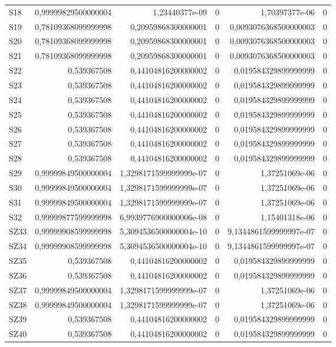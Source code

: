 \begin{longtable}{lrrrrr}
S18 & 0,99999829500000004 & 1,23440377e-09 & 0 & 1,70397377e-06 & 0 \\
S19 & 0,78109368099999998 & 0,20959868300000001 & 0 & 0,0093076368500000003 & 0 \\
S20 & 0,78109368099999998 & 0,20959868300000001 & 0 & 0,0093076368500000003 & 0 \\
S21 & 0,78109368099999998 & 0,20959868300000001 & 0 & 0,0093076368500000003 & 0 \\
S22 & 0,539367508 & 0,44104816200000002 & 0 & 0,019584329899999999 & 0 \\
S23 & 0,539367508 & 0,44104816200000002 & 0 & 0,019584329899999999 & 0 \\
S24 & 0,539367508 & 0,44104816200000002 & 0 & 0,019584329899999999 & 0 \\
S25 & 0,539367508 & 0,44104816200000002 & 0 & 0,019584329899999999 & 0 \\
S26 & 0,539367508 & 0,44104816200000002 & 0 & 0,019584329899999999 & 0 \\
S27 & 0,539367508 & 0,44104816200000002 & 0 & 0,019584329899999999 & 0 \\
S28 & 0,539367508 & 0,44104816200000002 & 0 & 0,019584329899999999 & 0 \\
S29 & 0,99999849500000004 & 1,3298171599999999e-07 & 0 & 1,37251069e-06 & 0 \\
S30 & 0,99999849500000004 & 1,3298171599999999e-07 & 0 & 1,37251069e-06 & 0 \\
S31 & 0,99999849500000004 & 1,3298171599999999e-07 & 0 & 1,37251069e-06 & 0 \\
S32 & 0,99999877599999998 & 6,9939776900000006e-08 & 0 & 1,15401318e-06 & 0 \\
SZ33 & 0,99999908599999998 & 5,3094536500000004e-10 & 0 & 9,1344861599999997e-07 & 0 \\
SZ34 & 0,99999908599999998 & 5,3094536500000004e-10 & 0 & 9,1344861599999997e-07 & 0 \\
SZ35 & 0,539367508 & 0,44104816200000002 & 0 & 0,019584329899999999 & 0 \\
SZ36 & 0,539367508 & 0,44104816200000002 & 0 & 0,019584329899999999 & 0 \\
SZ37 & 0,99999849500000004 & 1,3298171599999999e-07 & 0 & 1,37251069e-06 & 0 \\
SZ38 & 0,99999849500000004 & 1,3298171599999999e-07 & 0 & 1,37251069e-06 & 0 \\
SZ39 & 0,539367508 & 0,44104816200000002 & 0 & 0,019584329899999999 & 0 \\
SZ40 & 0,539367508 & 0,44104816200000002 & 0 & 0,019584329899999999 & 0 \\
\hline
\end{longtable}